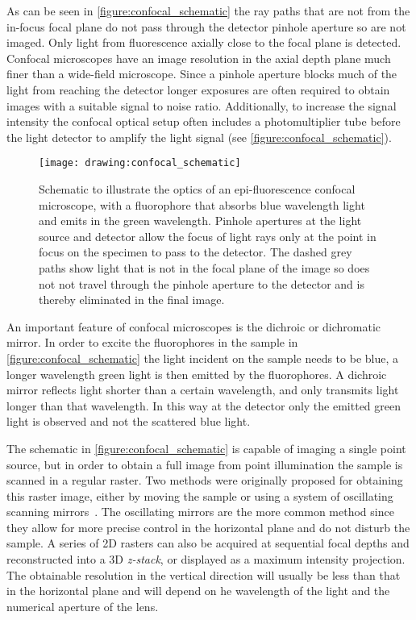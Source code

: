 As can be seen in \autoref{figure:confocal_schematic} the ray paths that are not from the in-focus focal plane do not pass through the detector pinhole aperture so are not imaged. Only light from fluorescence axially close to the focal plane is detected. Confocal microscopes have an image resolution in the axial depth plane much finer than a wide-field microscope. Since a pinhole aperture blocks much of the light from reaching the detector longer exposures are often required to obtain images with a suitable signal to noise ratio. Additionally, to increase the signal intensity the confocal optical setup often includes a photomultiplier tube before the light detector to amplify the light signal (see \autoref{figure:confocal_schematic}).

\begin{figure}[htbp!]
	\centering
	\texttt{[image: drawing:confocal\_schematic]}
	\caption[Schematic of confocal microscopy optics]{Schematic to illustrate the optics of an epi-fluorescence confocal microscope, with a fluorophore that absorbs blue wavelength light and emits in the green wavelength. Pinhole apertures at the light source and detector allow the focus of light rays only at the point in focus on the specimen to pass to the detector. The dashed grey paths show light that is not in the focal plane of the image so does not not travel through the pinhole aperture to the detector and is thereby eliminated in the final image.}
	\label{figure:confocal_schematic}
\end{figure}

An important feature of confocal microscopes is the dichroic or dichromatic mirror. In order to excite the fluorophores in the sample in \autoref{figure:confocal_schematic} the light incident on the sample needs to be blue, a longer wavelength green light is then emitted by the fluorophores. A dichroic mirror reflects light shorter than a certain wavelength, and only transmits light longer than that wavelength. In this way at the detector only the emitted green light is observed and not the scattered blue light.

The schematic in \autoref{figure:confocal_schematic} is capable of imaging a single point source, but in order to obtain a full image from point illumination the sample is scanned in a regular raster. Two methods were originally proposed for obtaining this raster image, either by moving the sample or using a system of oscillating scanning mirrors~\cite{Minsky1988}. The oscillating mirrors are the more common method since they allow for more precise control in the horizontal plane and do not disturb the sample. A series of 2D rasters can also be acquired at sequential focal depths and reconstructed into a 3D \emph{z-stack}, or displayed as a maximum intensity projection. The obtainable resolution in the vertical direction will usually be less than that in the horizontal plane and will depend on he wavelength of the light and the numerical aperture of the lens.

